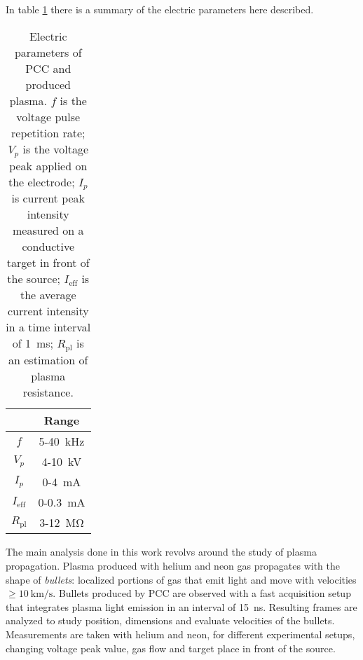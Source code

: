 In table \ref{tab:el_sum} there is a summary of the electric parameters here described.
\begin{table}[h]
 \centering
 \begin{tabular}{cc}
  \toprule
                    &Range\\
  \midrule
  $f$               &\num{5}-\SI{40}{\kilo\hertz}\\
  $V_{p}$           &\num{4}-\SI{10}{\kilo\volt}\\
  $I_{p}$           &\num{0}-\SI{4}{\milli\ampere}\\
  $I_{\text{eff}}$  &\num{0}-\SI{0.3}{\milli\ampere}\\
  $R_{\text{pl}}$   &\num{3}-\SI{12}{\mega\ohm}\\
  \bottomrule
 \end{tabular}
 \caption{Electric parameters of PCC and produced plasma. $f$ is the voltage pulse repetition rate; $V_{p}$ is the voltage peak applied on the electrode; $I_{p}$ is current peak intensity measured on a conductive target in front of the source; $I_{\text{eff}}$ is the average current intensity in a time interval of \SI{1}{\milli\second}; $R_{\text{pl}}$ is an estimation of plasma resistance.}
 \label{tab:el_sum}
\end{table}


The main analysis done in this work revolvs around the study of plasma propagation. Plasma produced with helium and neon gas propagates with the shape of \emph{bullets}: localized portions of gas that emit light and move with velocities $\ge \SI{10}{\kilo\meter/\second}$.
Bullets produced by PCC are observed with a fast acquisition setup that integrates plasma light emission in an interval of \SI{15}{\nano\second}. Resulting frames are analyzed to study position, dimensions and evaluate velocities of the bullets. Measurements are taken with helium and neon, for different experimental setups, changing voltage peak value, gas flow and target place in front of the source.

